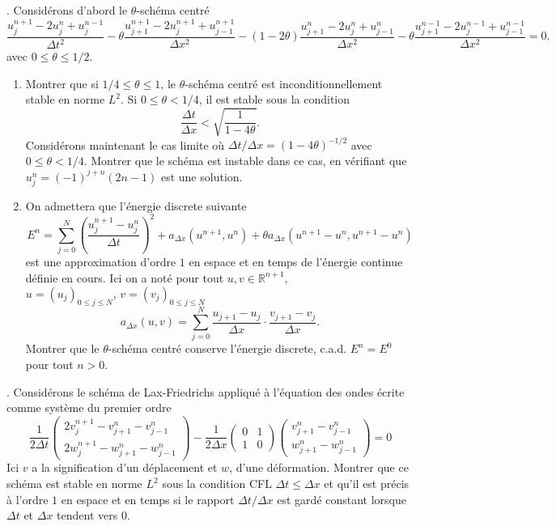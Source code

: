 \documentclass[12pt,a4paper]{article}
\begin{document}
. Consid\'erons d'abord le $\theta$-sch\'ema centr\'e
\begin{equation}
\frac{u_j^{n+1}-2u_j^n+u_j^{n-1}}{\Delta t^2}-\theta
\frac{u_{j+1}^{n+1}-2u_j^{n+1}+u_{j-1}^{n+1}}{\Delta
  x^2}-(1-2\theta)\frac{u_{j+1}^{n}-2u_j^{n}+u_{j-1}^{n}}{\Delta
  x^2}-\theta \frac{u_{j+1}^{n-1}-2u_j^{n-1}+u_{j-1}^{n-1}}{\Delta
  x^2}=0.
\end{equation}
avec $0\le \theta \le 1/2$.
\begin{enumerate}

\item Montrer que si $1/4\le \theta \le 1$, le $\theta$-sch\'ema
  centr\'e est inconditionnellement stable en norme $L^2$. Si $0\le
  \theta < 1/4$, il est stable sous la condition
$$
\frac{\Delta t}{\Delta x} < \sqrt{\frac{1}{1-4\theta}}.
$$
Consid\'erons maintenant le cas limite o\`u $\Delta t/\Delta
  x=(1-4\theta)^{-1/2}$ avec $0\le \theta < 1/4$. Montrer que le
  sch\'ema est instable dans ce cas, en v\'erifiant que $u_j^n =
  (-1)^{j+n}(2n-1)$ est une solution.
\item On admettera que l'\'energie discrete suivante
$$
E^n=\sum_{j=0}^N\left(\frac{u_j^{n+1}-u_j^n}{\Delta
    t}\right)^2+a_{\Delta x}(u^{n+1},u^n)+\theta a_{\Delta x}(u^{n+1}-u^n,u^{n+1}-u^n)
$$
est une approximation d'ordre $1$ en espace et en temps de l'\'energie
continue d\'efinie en cours. Ici on a not\'e pour tout
$u,v\in\mathbb{R}^{n+1}$, $u=(u_j)_{0\le j\le N},\, v=(v_j)_{0\le j\le N}$
$$
a_{\Delta x}(u,v)=\sum_{j=0}^N \frac{u_{j+1}-u_j}{\Delta x}\cdot
\frac{v_{j+1}-v_j}{\Delta x}.
$$
Montrer que le $\theta$-sch\'ema centr\'e conserve l'\'energie
discrete, c.a.d. $E^n=E^0$ pour tout $n>0$.
\end{enumerate}
. Consid\'erons le sch\'ema de
Lax-Friedrichs appliqu\'e \`a l'\'equation des ondes \'ecrite comme
syst\`eme du premier ordre
\begin{equation}
\displaystyle \frac{1}{2\Delta t}\left(\begin{array}{c}
    2v_j^{n+1}-v_{j+1}^n-v_{j-1}^n \\2w_j^{n+1}-w_{j+1}^n-w_{j-1}^n \end{array}\right)-\frac{1}{2\Delta x}\left(\begin{array}{cc}
    0 & 1 \\1 & 0 \end{array}\right)
\left(\begin{array}{c} v_{j+1}^n - v_{j-1}^n \\ w_{j+1}^n - w_{j-1}^n\end{array}\right) = 0
\end{equation}
Ici $v$ a la signification d'un d\'eplacement et $w$, d'une
d\'eformation. Montrer que ce sch\'ema est stable en norme $L^2$ sous la condition CFL $\Delta
t\le \Delta x$ et qu'il est pr\'ecis \`a l'ordre $1$ en espace et en
temps si le rapport $\Delta t/\Delta x$ est gard\'e constant lorsque
$\Delta t$ et $\Delta x$ tendent vers $0$.\\
\end{document}
